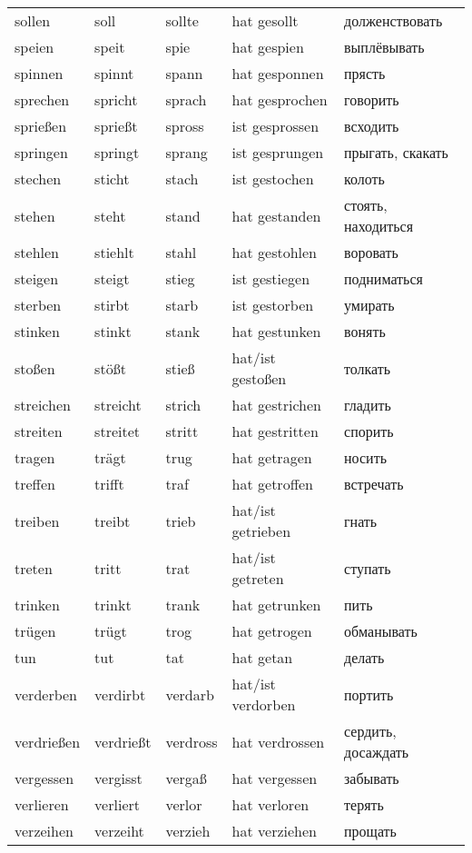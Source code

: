 \begin{longtable}{|l|l|l|l|l|}
sollen & soll & sollte & hat gesollt & долженствовать \\
speien & speit & spie & hat gespien & выплёвывать \\
spinnen & spinnt & spann & hat gesponnen & прясть \\
sprechen & spricht & sprach & hat gesprochen & говорить \\
sprie\ss en & sprie\ss t & spross & ist gesprossen & всходить \\
springen & springt & sprang & ist gesprungen & прыгать, скакать \\
stechen & sticht & stach & ist gestochen & колоть \\
stehen & steht & stand & hat gestanden & стоять, находиться \\
stehlen & stiehlt & stahl & hat gestohlen & воровать \\
steigen & steigt & stieg & ist gestiegen & подниматься \\
sterben & stirbt & starb & ist gestorben & умирать \\
stinken & stinkt & stank & hat gestunken & вонять \\
sto\ss en & st\"o\ss t & stie\ss  & hat/ist gesto\ss en & толкать \\
streichen & streicht & strich & hat gestrichen & гладить \\
streiten & streitet & stritt & hat gestritten & спорить \\
tragen & tr\"agt & trug & hat getragen & носить \\
treffen & trifft & traf & hat getroffen & встречать \\
treiben & treibt & trieb & hat/ist getrieben & гнать \\
treten & tritt & trat & hat/ist getreten & ступать \\
trinken & trinkt & trank & hat getrunken & пить \\
tr\"ugen & tr\"ugt & trog & hat getrogen & обманывать \\
tun & tut & tat & hat getan & делать \\
verderben & verdirbt & verdarb & hat/ist verdorben & портить \\
verdrie\ss en & verdrie\ss t & verdross & hat verdrossen & сердить, досаждать \\
vergessen & vergisst & verga\ss  & hat vergessen & забывать \\
verlieren & verliert & verlor & hat verloren & терять \\
verzeihen & verzeiht & verzieh & hat verziehen & прощать \\

\end{longtable}
